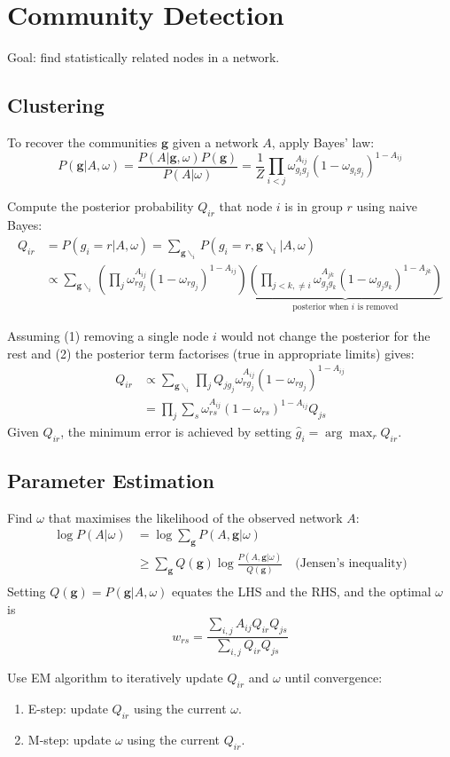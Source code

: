 \documentclass[12pt]{article}
\begin{document}
\section{Community Detection}
Goal: find statistically related nodes in a network.

\subsection{Clustering}
To recover the communities $\boldsymbol{g}$ given a network $A$, apply Bayes' law:
$$
P(\boldsymbol{g} | A, \omega) = \frac{P(A | \boldsymbol{g}, \omega) P(\boldsymbol{g})}{P(A | \omega)} = \frac{1}{Z}\prod_{i < j} \omega_{g_i g_j}^{A_{ij}} (1 - \omega_{g_i g_j})^{1 - A_{ij}}
$$

Compute the posterior probability $Q_{ir}$ that node $i$ is in group $r$ using naive Bayes:
\begin{align*}
    Q_{ir} &= P(g_i = r | A, \omega) = \sum_{\boldsymbol{g}\backslash_i} P(g_i = r, \boldsymbol{g}\backslash_i | A, \omega) \\
    &\propto \sum_{\boldsymbol{g}\backslash_i} \left(\prod_j \omega_{r g_j}^{A_{ij}} (1 - \omega_{r g_j})^{1 - A_{ij}}\right) \underbrace{\left(\prod_{j < k, \neq i} \omega_{g_j g_k}^{A_{jk}} (1 - \omega_{g_j g_k})^{1 - A_{jk}}\right)}_{\text{posterior when $i$ is removed}}
\end{align*}

Assuming (1) removing a single node $i$ would not change the posterior for the rest and (2) the posterior term factorises (true in appropriate limits) gives:
\begin{align*}
    Q_{ir} &\propto \sum_{\boldsymbol{g}\backslash_i} \prod_j Q_{jg_j} \omega_{r g_j}^{A_{ij}} (1 - \omega_{r g_j})^{1 - A_{ij}} \\
    &= \prod_j \sum_s \omega_{r s}^{A_{ij}} (1 - \omega_{r s})^{1 - A_{ij}} Q_{js}
\end{align*}
Given $Q_{ir}$, the minimum error is achieved by setting $\hat{g}_i = \arg\max_r Q_{ir}$.

\subsection{Parameter Estimation}
Find $\omega$ that maximises the likelihood of the observed network $A$:
\begin{align*}
\log P(A | \omega) &= \log \sum_{\boldsymbol{g}} P(A , \boldsymbol{g} | \omega) \\
&\geq \sum_{\boldsymbol{g}} Q(\boldsymbol{g}) \log \frac{P(A, \boldsymbol{g} | \omega)}{Q(\boldsymbol{g})} \quad\text{(Jensen's inequality)} \\
\end{align*}
Setting $Q(\boldsymbol{g}) = P(\boldsymbol{g} | A, \omega)$ equates the LHS and the RHS, and the optimal $\omega$ is
$$
w_{rs} = \frac{\sum_{i,j} A_{ij} Q_{ir} Q_{js}}{\sum_{i,j} Q_{ir} Q_{js}}
$$

Use EM algorithm to iteratively update $Q_{ir}$ and $\omega$ until convergence:
\begin{enumerate}
    \item E-step: update $Q_{ir}$ using the current $\omega$.
    \item M-step: update $\omega$ using the current $Q_{ir}$.
\end{enumerate}
\end{document}
